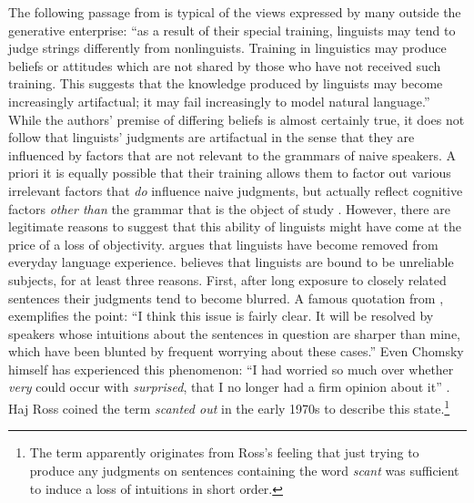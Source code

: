 The following passage from \citet[968]{BradacEtAl1980} is typical of the views expressed by many outside the generative enterprise: ``as a result of their special training, linguists may tend to judge strings differently from nonlinguists. Training in linguistics may produce beliefs or attitudes which are not shared by those who have not received such training. This suggests that the knowledge produced by linguists may become increasingly artifactual; it may fail increasingly to model natural language.'' While the authors' premise of differing beliefs is almost certainly true, it does not follow that linguists' judgments are artifactual in the sense that they are influenced by factors that are not relevant to the grammars of naive speakers. A priori it is equally possible that their training allows them to factor out various irrelevant factors that \textit{do} influence naive judgments, but actually reflect cognitive factors \textit{other than} the grammar that is the object of study \citep{Levelt1974}. However, there are legitimate reasons to suggest that this ability of linguists might have come at the price of a loss of objectivity. \citet{Labov1972a} argues that linguists have become removed from everyday language experience. \citet{Greenbaum1976a,Greenbaum1977c} believes that linguists are bound to be unreliable subjects, for at least three reasons. First, after long exposure to closely related sentences their judgments tend to become blurred. A famous quotation from \citet[178]{Fraser1971}, exemplifies the point: ``I think this issue is fairly clear. It will be resolved by speakers whose intuitions about the sentences in question are sharper than mine, which have been blunted by frequent worrying about these cases.'' Even Chomsky himself has experienced this phenomenon: ``I had worried so much over whether \textit{very} could occur with \textit{surprised}, that I no longer had a firm opinion about it'' \citep[172]{Chomsky1962}. Haj Ross coined the term \textit{scanted out} in the early 1970s to describe this state.\footnote{The term apparently originates from Ross's feeling that just trying to produce any judgments on sentences containing the word \textit{scant} was sufficient to induce a loss of intuitions in short order.} 
